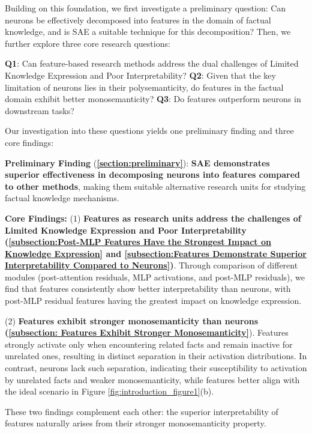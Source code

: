 Building on this foundation, we first investigate a preliminary question: Can neurons be effectively decomposed into features in the domain of factual knowledge, and is SAE a suitable technique for this decomposition? Then, we further explore three core research questions:

\textbf{Q1}: Can feature-based research methods address the dual challenges of Limited Knowledge Expression and Poor Interpretability?
\textbf{Q2}: Given that the key limitation of neurons lies in their polysemanticity, do features in the factual domain exhibit better monosemanticity?
\textbf{Q3}: Do features outperform neurons in downstream tasks?


Our investigation into these questions yields one preliminary finding and three core findings:

\textbf{Preliminary Finding} (\textbf{\textsection\ref{section:preliminary}}):  \textbf{SAE demonstrates superior effectiveness in decomposing neurons into features compared to other methods}, making them suitable alternative research units for studying factual knowledge mechanisms.

\textbf{Core Findings:}
(1) \textbf{Features as research units address the challenges of Limited Knowledge Expression and Poor Interpretability (\textsection\ref{subsection:Post-MLP Features Have the Strongest Impact on Knowledge Expression} and \textsection\ref{subsection:Features Demonstrate Superior Interpretability Compared to Neurons})}.  Through comparison of different modules (post-attention residuals, MLP activations, and post-MLP residuals), we find that features consistently show better interpretability than neurons, with post-MLP residual features having the greatest impact on knowledge expression.

(2) \textbf{Features exhibit stronger monosemanticity than neurons (\textsection\ref{subsection: Features Exhibit Stronger Monosemanticity}}).
Features strongly activate only when encountering related facts and remain inactive for unrelated ones, resulting in distinct separation in their activation distributions. In contrast, neurons lack such separation, indicating their susceptibility to activation by unrelated facts and weaker monosemanticity, while features better align with the ideal scenario in Figure \ref{fig:introduction_figure1}(b).

These two findings complement each other: the superior interpretability of features  naturally arises from their stronger monosemanticity property.

